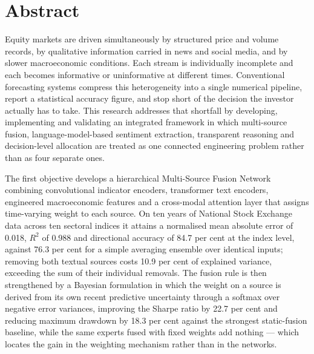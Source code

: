 \chapter*{Abstract}

Equity markets are driven simultaneously by structured price and volume records, by
qualitative information carried in news and social media, and by slower macroeconomic
conditions. Each stream is individually incomplete and each becomes informative or
uninformative at different times. Conventional forecasting systems compress this heterogeneity
into a single numerical pipeline, report a statistical accuracy figure, and stop short of the
decision the investor actually has to take. This research addresses that shortfall by
developing, implementing and validating an integrated framework in which multi-source fusion,
language-model-based sentiment extraction, transparent reasoning and decision-level allocation
are treated as one connected engineering problem rather than as four separate ones.

The first objective develops a hierarchical Multi-Source Fusion Network combining
convolutional indicator encoders, transformer text encoders, engineered macroeconomic features
and a cross-modal attention layer that assigns time-varying weight to each source. On ten
years of National Stock Exchange data across ten sectoral indices it attains a normalised mean
absolute error of 0.018, $R^2$ of 0.988 and directional accuracy of 84.7 per cent at the index
level, against 76.3 per cent for a simple averaging ensemble over identical inputs; removing
both textual sources costs 10.9 per cent of explained variance, exceeding the sum of their
individual removals. The fusion rule is then strengthened by a Bayesian formulation in which
the weight on a source is derived from its own recent predictive uncertainty through a softmax
over negative error variances, improving the Sharpe ratio by 22.7 per cent and reducing
maximum drawdown by 18.3 per cent against the strongest static-fusion baseline, while the same
experts fused with fixed weights add nothing --- which locates the gain in the weighting
mechanism rather than in the networks.

